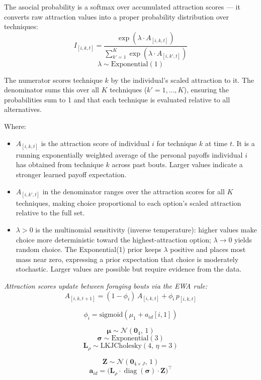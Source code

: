 \documentclass[
  letterpaper,
  DIV=11,
  numbers=noendperiod]{scrartcl}
\providecommand{\tightlist}{%
  \setlength{\itemsep}{0pt}\setlength{\parskip}{0pt}}\usepackage{longtable,booktabs,array}
\begin{document}
The asocial probability is a softmax over accumulated attraction scores
--- it converts raw attraction values into a proper probability
distribution over techniques: \[
I_{[i,k,t]} = \frac{\exp(\lambda \cdot A_{[i,k,t]})}{\sum_{k'=1}^{K} \exp(\lambda \cdot A_{[i,k',t]})}
\] \[
\lambda \sim \text{Exponential}(1)
\]

The numerator scores technique \(k\) by the individual's scaled
attraction to it. The denominator sums this over all \(K\) techniques
(\(k' = 1,\ldots,K\)), ensuring the probabilities sum to 1 and that each
technique is evaluated relative to all alternatives.

Where:

\begin{itemize}
\tightlist
\item
  \(A_{[i,k,t]}\) is the attraction score of individual \(i\) for
  technique \(k\) at time \(t\). It is a running exponentially weighted
  average of the personal payoffs individual \(i\) has obtained from
  technique \(k\) across past bouts. Larger values indicate a stronger
  learned payoff expectation.
\item
  \(A_{[i,k',t]}\) in the denominator ranges over the attraction scores
  for all \(K\) techniques, making choice proportional to each option's
  scaled attraction relative to the full set.
\item
  \(\lambda > 0\) is the multinomial sensitivity (inverse temperature):
  higher values make choice more deterministic toward the
  highest-attraction option; \(\lambda \to 0\) yields random choice. The
  Exponential(1) prior keeps \(\lambda\) positive and places most mass
  near zero, expressing a prior expectation that choice is moderately
  stochastic. Larger values are possible but require evidence from the
  data.
\end{itemize}

\emph{Attraction scores update between foraging bouts via the EWA rule:}
\[
A_{[i,k,t+1]} = (1 - \phi_i)\, A_{[i,k,t]} + \phi_i\, p_{[i,k,t]}
\]

\[
\phi_i = \text{sigmoid}(\mu_1 + a_{id}[i,1])
\]

\[
\boldsymbol{\mu} \sim \mathcal{N}(\mathbf{0}_4,\, 1)
\] \[
\boldsymbol{\sigma} \sim \text{Exponential}(3)
\] \[
\mathbf{L}_\rho \sim \text{LKJCholesky}(4,\, \eta = 3)
\]

\[
\mathbf{Z} \sim \mathcal{N}(\mathbf{0}_{4 \times J},\, 1)
\] \[
\mathbf{a}_{id} = \bigl(\mathbf{L}_\rho \cdot \operatorname{diag}(\boldsymbol{\sigma}) \cdot \mathbf{Z}\bigr)^\top
\]
\end{document}
